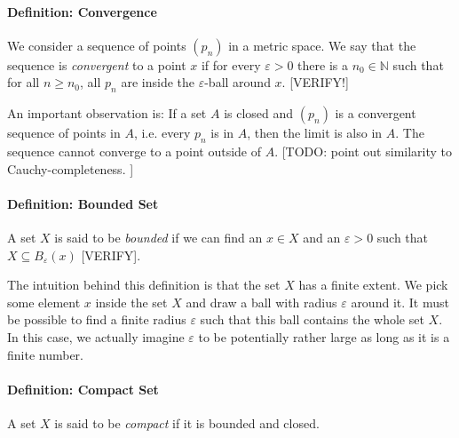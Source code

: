 \paragraph{Definition: Convergence} We consider a sequence of points $(p_n)$ in a metric space. We say that the sequence is \emph{convergent} to a point $x$ if for every $\varepsilon > 0$ there is a $n_0 \in \mathbb{N}$ such that for all $n \geq n_0$, all $p_n$ are inside the $\varepsilon$-ball around $x$. [VERIFY!]

\medskip
An important observation is: If a set $A$ is closed and $(p_n)$ is a convergent sequence of points in $A$, i.e. every $p_n$ is in $A$, then the limit is also in $A$. The sequence cannot converge to a point outside of $A$. [TODO: point out similarity to Cauchy-completeness. ]





% 


\paragraph{Definition: Bounded Set} A set $X$ is said to be \emph{bounded} if we can find an $x \in X$ and an $\varepsilon > 0$ such that $X \subseteq B_\varepsilon(x)$ [VERIFY]. 

\medskip
The intuition behind this definition is that the set $X$ has a finite extent. We pick some element $x$ inside the set $X$ and draw a ball with radius $\varepsilon$ around it. It must be possible to find a finite radius $\varepsilon$ such that this ball contains the whole set $X$. In this case, we actually imagine $\varepsilon$ to be potentially rather large as long as it is a finite number.

\paragraph{Definition: Compact Set} A set $X$ is said to be \emph{compact} if it is bounded and closed.

